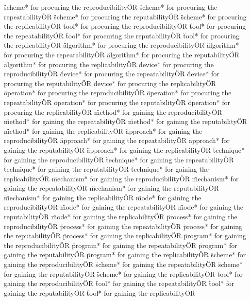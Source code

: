 \documentclass[
10pt, %
a4paper, %
oneside, %
headinclude,footinclude, %
BCOR5mm, %
]{scrartcl}
\begin{document}
\"scheme* for procuring the reproducibility\" OR \"scheme* for procuring the repeatability\" OR \"scheme* for procuring the reputability\" OR \"scheme* for procuring the replicability\" OR 
\"tool* for procuring the reproducibility\" OR \"tool* for procuring the repeatability\" OR \"tool* for procuring the reputability\" OR \"tool* for procuring the replicability\" OR 
\"algorithm* for procuring the reproducibility\" OR \"algorithm* for procuring the repeatability\" OR \"algorithm* for procuring the reputability\" OR \"algorithm* for procuring the replicability\" OR 
\"device* for procuring the reproducibility\" OR \"device* for procuring the repeatability\" OR \"device* for procuring the reputability\" OR \"device* for procuring the replicability\" OR 
\"operation* for procuring the reproducibility\" OR \"operation* for procuring the repeatability\" OR \"operation* for procuring the reputability\" OR \"operation* for procuring the replicability\" OR 
\"method* for gaining the reproducibility\" OR \"method* for gaining the repeatability\" OR \"method* for gaining the reputability\" OR \"method* for gaining the replicability\" OR 
\"approach* for gaining the reproducibility\" OR \"approach* for gaining the repeatability\" OR \"approach* for gaining the reputability\" OR \"approach* for gaining the replicability\" OR 
\"technique* for gaining the reproducibility\" OR \"technique* for gaining the repeatability\" OR \"technique* for gaining the reputability\" OR \"technique* for gaining the replicability\" OR 
\"mechanism* for gaining the reproducibility\" OR \"mechanism* for gaining the repeatability\" OR \"mechanism* for gaining the reputability\" OR \"mechanism* for gaining the replicability\" OR 
\"mode* for gaining the reproducibility\" OR \"mode* for gaining the repeatability\" OR \"mode* for gaining the reputability\" OR \"mode* for gaining the replicability\" OR 
\"process* for gaining the reproducibility\" OR \"process* for gaining the repeatability\" OR \"process* for gaining the reputability\" OR \"process* for gaining the replicability\" OR 
\"program* for gaining the reproducibility\" OR \"program* for gaining the repeatability\" OR \"program* for gaining the reputability\" OR \"program* for gaining the replicability\" OR 
\"scheme* for gaining the reproducibility\" OR \"scheme* for gaining the repeatability\" OR \"scheme* for gaining the reputability\" OR \"scheme* for gaining the replicability\" OR 
\"tool* for gaining the reproducibility\" OR \"tool* for gaining the repeatability\" OR \"tool* for gaining the reputability\" OR \"tool* for gaining the replicability\" OR 
\end{document}
